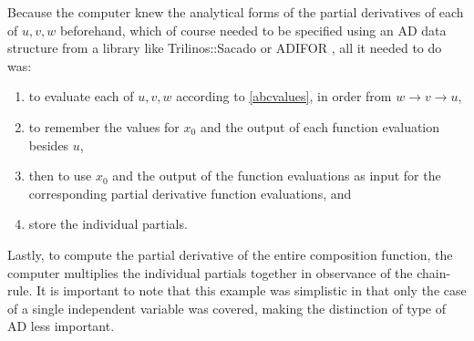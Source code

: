 \documentclass[preprint,12pt]{elsarticle}
\begin{document}
Because the computer knew the analytical forms of the partial derivatives of each of $u,v,w$ beforehand, which of course needed to be specified using an AD data structure from a library like Trilinos::Sacado \cite{trilinos} or ADIFOR \cite{bischof1995adifor},
all it needed to do was:
\begin{enumerate}
\item to evaluate each of $u,v,w$ according to \ref{abcvalues}, in order from $w \rightarrow
v \rightarrow u$, 
\item to remember the values for $x_0$ and the output of each function evaluation besides  $u$, 
\item then to use $x_0$ and the output of the function evaluations as input for the corresponding partial
derivative function  evaluations, and
\item store the individual partials.
\end{enumerate}
Lastly, to compute the partial derivative of the entire composition function, the computer multiplies
the individual partials together in observance of the chain-rule. It is important to note that this example
was simplistic in that only the case of a single independent variable was covered, making the distinction of type of AD
less important. 
\end{document}
